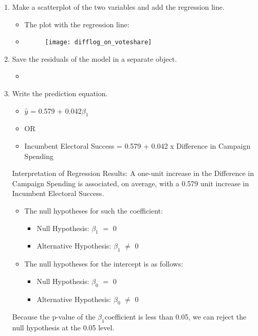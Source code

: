 \documentclass[12pt,letterpaper]{article}
\begin{document}
\begin{enumerate}
		\item Make a scatterplot of the two variables and add the regression line. 	

\begin{itemize}
	\item The plot with the regression line:
	\item 
	\begin{figure}[h]
		\centering
		\texttt{[image: difflog\_on\_voteshare]}
	\end{figure} 
\end{itemize}
\vspace{5cm}

		\item Save the residuals of the model in a separate object.
		
\begin{itemize}
	\item 
\end{itemize}


		\item Write the prediction equation.

\begin{itemize}
	\item$\hat{y}$ = 0.579 + 0.042$\beta_1$
	\item OR
	\item Incumbent Electoral Success =  0.579 + 0.042 x Difference in Campaign Spending
\end{itemize}

\begin{flushleft}Interpretation of Regression Results: A one-unit increase in the Difference in Campaign Spending is associated, on average, with a 0.579 unit increase in Incumbent Electoral Success.
\end{flushleft}

\begin{itemize}
	\item  The null hypotheses for such the coefficient:
	\begin{itemize}
		\item {Null Hypothesis: $\beta_1$ $=$ 0}
		\item {Alternative Hypothesis: $\beta_1$ $\neq$ 0}
	\end{itemize}

\item The null hypotheses for the intercept is as follows:
\begin{itemize}
	\item {Null Hypothesis: $\beta_0$ $=$ 0}
	\item {Alternative Hypothesis: $\beta_0$ $\neq$ 0}
\end{itemize}

\end{itemize}

\begin{flushleft}Because the p-value of the $\beta_1$coefficient is less than 0.05, we can reject the null hypothesis at the 0.05 level.
\end{flushleft}
	\end{enumerate}
\end{document}
